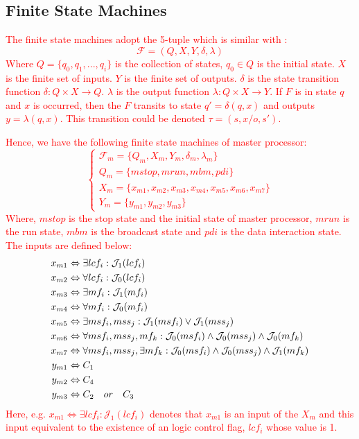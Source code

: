\documentclass[journal,UTF8]{IEEEtran}
\begin{document}
 \subsection{Finite State Machines}
 \textcolor{red}{ The finite state machines adopt the 5-tuple which is similar with \cite{Hierons2016Parallel}:
 \begin{equation}
 \mathcal{F} = (Q, X, Y, \delta, \lambda)
 \end{equation}
 Where $Q = \{q_0, q_1,..., q_i\}$ is the collection of states, $q_0 \in Q$ is the initial state. $X$ is the finite set of inputs. $Y$ is the finite set of outputs. $\delta$ is the state transition function $\delta: Q\times X \rightarrow Q$. $\lambda$ is the output function $\lambda: Q\times X\rightarrow Y$. If $F$ is in state $q$ and $x$ is occurred, then the $F$ transits to state $q' = \delta(q, x)$ and outputs $y = \lambda(q, x)$. This transition could be denoted $\tau = (s,x/o,s')$.}
 
 \textcolor{red}{Hence, we have the following finite state machines of master processor:
  \begin{equation}
  \label{FMaster}
 \left\{
 \begin{array}{l}
 \mathcal{F}_{m} = \{Q_m, X_m, Y_m,\delta_m, \lambda_m\}\\
 Q_m = \{mstop, mrun, mbm, pdi\}\\
 X_m = \{x_{m1}, x_{m2}, x_{m3}, x_{m4}, x_{m5}, x_{m6}, x_{m7}\}\\
 Y_m = \{y_{m1}, y_{m2}, y_{m3}\}
 \end{array}
 \right.
 \end{equation}
 Where, $mstop$ is the stop state and the initial state of master processor, $mrun$ is the run state, $mbm$ is the broadcast state and $pdi$ is the data interaction state. The inputs are defined below:
 \begin{align}
 \notag x_{m1}&\Leftrightarrow \exists lcf_i: \mathcal{J}_1(lcf_i)\\
\notag x_{m2}&\Leftrightarrow  \forall lcf_i: \mathcal{J}_0(lcf_i)\\
\notag x_{m3}&\Leftrightarrow \exists mf_i: \mathcal{J}_1(mf_i)\\
\notag x_{m4}&\Leftrightarrow \forall mf_i: \mathcal{J}_0(mf_i)\\
\notag x_{m5}&\Leftrightarrow \exists msf_i, mss_j: \mathcal{J}_1(msf_i) \lor \mathcal{J}_1(mss_j)\\
\notag x_{m6}&\Leftrightarrow \forall msf_i, mss_j, mf_k: \mathcal{J}_0(msf_i) \land \mathcal{J}_0(mss_j) \land \mathcal{J}_0(mf_k)\\
\notag x_{m7}&\Leftrightarrow \forall msf_i, mss_j, \exists mf_k: \mathcal{J}_0(msf_i) \land \mathcal{J}_0(mss_j) \land \mathcal{J}_1(mf_k)\\
\notag y_{m1}&\Leftrightarrow C_1\\
\notag y_{m2}&\Leftrightarrow C_4\\
\notag y_{m3}&\Leftrightarrow C_2\quad or\quad C_3
 \end{align}}
\textcolor{red}{Here, e.g. $x_{m1}\Leftrightarrow \exists lcf_i: \mathcal{J}_1(lcf_i)$ denotes that $x_{m1}$ is an input of the $X_m$ and this input equivalent to the existence of an logic control flag, $lcf_i$ whose value is 1.}
\end{document}
